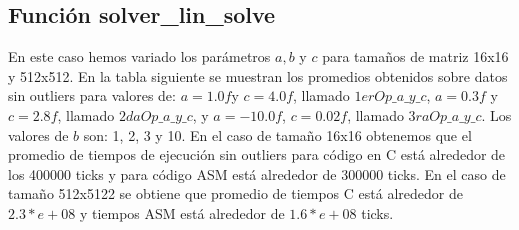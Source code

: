 \subsection{Función solver\_lin\_solve}
\par En este caso hemos variado los parámetros $a,b$ y $c$ para tamaños de matriz 16x16 y 512x512. En la tabla siguiente se muestran los promedios obtenidos sobre datos sin outliers para valores de: $a = 1.0f $y $c = 4.0f$, llamado $1erOp\_a\_y\_c$, $a = 0.3f$ y $c = 2.8f$, llamado $2daOp\_a\_y\_c$, y $a = -10.0f$, $c = 0.02f$, llamado $3raOp\_a\_y\_c$. Los valores de $b$ son: 1, 2, 3 y 10. En el caso de tamaño 16x16 obtenemos que el promedio de tiempos de ejecución sin outliers para código en C está alrededor de los 400000 ticks y para código ASM está alrededor de 300000 ticks. En el caso de tamaño 512x5122 se obtiene que promedio de tiempos C está alrededor de $2.3*e+08$ y tiempos ASM está alrededor de $1.6*e+08 $ ticks.\newline

